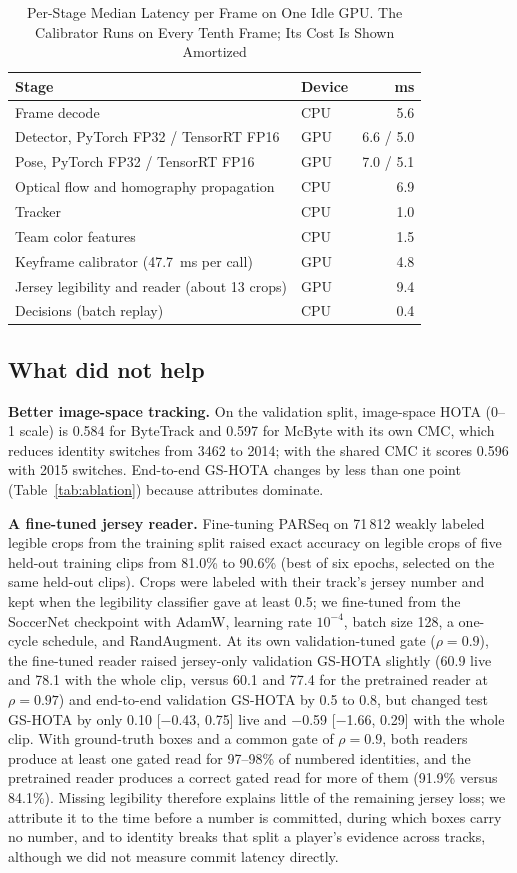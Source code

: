 \documentclass[conference]{IEEEtran}
\begin{document}
\begin{table}[t]
\caption{Per-Stage Median Latency per Frame on One Idle GPU. The Calibrator Runs on Every Tenth Frame; Its Cost Is Shown Amortized}
\label{tab:speed}
\centering
\footnotesize
\begin{tabular}{@{}llr@{}}
\toprule
Stage & Device & ms \\
\midrule
Frame decode & CPU & 5.6 \\
Detector, PyTorch FP32 / TensorRT FP16 & GPU & 6.6 / 5.0 \\
Pose, PyTorch FP32 / TensorRT FP16 & GPU & 7.0 / 5.1 \\
Optical flow and homography propagation & CPU & 6.9 \\
Tracker & CPU & 1.0 \\
Team color features & CPU & 1.5 \\
Keyframe calibrator (47.7~ms per call) & GPU & 4.8 \\
Jersey legibility and reader (about 13 crops) & GPU & 9.4 \\
Decisions (batch replay) & CPU & 0.4 \\
\bottomrule
\end{tabular}
\end{table}

\subsection{What did not help}\label{sec:nothelp}
\textbf{Better image-space tracking.} On the validation split, image-space HOTA (0--1 scale) is 0.584 for ByteTrack and 0.597 for McByte with its own CMC, which reduces identity switches from 3462 to 2014; with the shared CMC it scores 0.596 with 2015 switches. End-to-end GS-HOTA changes by less than one point (Table~\ref{tab:ablation}) because attributes dominate.

\textbf{A fine-tuned jersey reader.} Fine-tuning PARSeq on 71\,812 weakly labeled legible crops from the training split raised exact accuracy on legible crops of five held-out training clips from 81.0\% to 90.6\% (best of six epochs, selected on the same held-out clips). Crops were labeled with their track's jersey number and kept when the legibility classifier gave at least 0.5; we fine-tuned from the SoccerNet checkpoint with AdamW, learning rate $10^{-4}$, batch size 128, a one-cycle schedule, and RandAugment. At its own validation-tuned gate ($\rho=0.9$), the fine-tuned reader raised jersey-only validation GS-HOTA slightly (60.9 live and 78.1 with the whole clip, versus 60.1 and 77.4 for the pretrained reader at $\rho=0.97$) and end-to-end validation GS-HOTA by 0.5 to 0.8, but changed test GS-HOTA by only 0.10 [$-$0.43, 0.75] live and $-$0.59 [$-$1.66, 0.29] with the whole clip. With ground-truth boxes and a common gate of $\rho=0.9$, both readers produce at least one gated read for 97--98\% of numbered identities, and the pretrained reader produces a correct gated read for more of them (91.9\% versus 84.1\%). Missing legibility therefore explains little of the remaining jersey loss; we attribute it to the time before a number is committed, during which boxes carry no number, and to identity breaks that split a player's evidence across tracks, although we did not measure commit latency directly.
\end{document}
